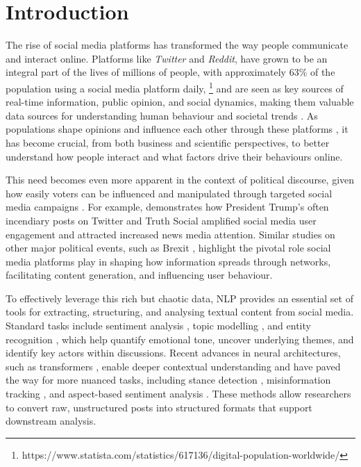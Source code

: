 \setlength{\headheight}{14.49998pt} %
\chapter{Introduction}\label{ch:intro} %

The rise of social media platforms has transformed the way people communicate and interact online. Platforms like \textit{Twitter} and \textit{Reddit}, have grown to be an integral part of the lives of millions of people, with approximately 63\% of the population using a social media platform daily, \footnote{https://www.statista.com/statistics/617136/digital-population-worldwide/} and are seen as key sources of real-time information, public opinion, and social dynamics, making them valuable data sources for understanding human behaviour and societal trends \cite{barbera2015birds,shu2017fake}. As populations shape opinions and influence each other through these platforms \cite{ausat2023role}, it has become crucial, from both business and scientific perspectives, to better understand how people interact and what factors drive their behaviours online.

This need becomes even more apparent in the context of political discourse, given how easily voters can be influenced and manipulated through targeted social media campaigns \cite{goodwin2023political}. For example, \citet{zhang2025trump} demonstrates how President Trump’s often incendiary posts on Twitter and Truth Social amplified social media user engagement and attracted increased news media attention. Similar studies on other major political events, such as Brexit \cite{mora2021influence}, highlight the pivotal role social media platforms play in shaping how information spreads through networks, facilitating content generation, and influencing user behaviour.

To effectively leverage this rich but chaotic data, \ac{NLP} provides an essential set of tools for extracting, structuring, and analysing textual content from social media. Standard tasks include sentiment analysis \cite{zimbra2018state}, topic modelling \cite{egger2022topic}, and entity recognition \cite{nasar2021named}, which help quantify emotional tone, uncover underlying themes, and identify key actors within discussions. Recent advances in neural architectures, such as transformers \cite{vaswani2017attention}, enable deeper contextual understanding and have paved the way for more nuanced tasks, including stance detection \cite{aldayel2021stance}, misinformation tracking \cite{hayawi2022anti}, and aspect-based sentiment analysis \cite{brauwers2022survey}. These methods allow researchers to convert raw, unstructured posts into structured formats that support downstream analysis.

